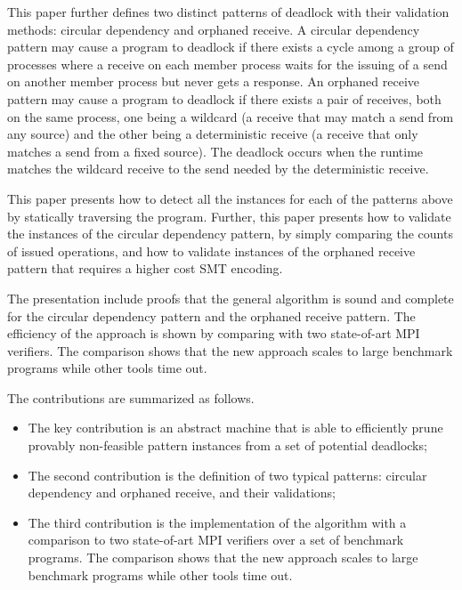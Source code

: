 This paper further defines two distinct patterns of deadlock with their validation methods: circular dependency and orphaned receive. A circular dependency pattern may cause a program to deadlock if there exists a cycle among a group of processes where a receive on each member process waits for the issuing of a send on another member process but never gets a response. An orphaned receive pattern may cause a program to deadlock if there exists a pair of receives, both on the same process, one being a wildcard (a receive that may match a send from any source) and the other being a deterministic receive (a receive that only matches a send from a fixed source). The deadlock occurs when the runtime matches the wildcard receive to the send needed by the deterministic receive. 

This paper presents how to detect all the instances for each of the patterns above by statically traversing the program. Further, this paper presents how to validate the instances of the circular dependency pattern, by simply comparing the counts of issued operations, and how to validate instances of the orphaned receive pattern that requires a higher cost SMT encoding. 

The presentation include proofs that the general algorithm is sound and complete for the circular dependency pattern and the orphaned receive pattern. The efficiency of the approach is shown by comparing with two state-of-art MPI verifiers. The comparison shows that the new approach scales to large benchmark programs while other tools time out.


The contributions are summarized as follows.
\begin{itemize}
\item The key contribution is an abstract machine that is able to efficiently prune provably non-feasible pattern instances from a set of potential deadlocks; 
\item The second contribution is the definition of two typical patterns: circular dependency and orphaned receive, and their validations;
\item The third contribution is the implementation of the algorithm with a comparison to two state-of-art MPI verifiers over a set of benchmark programs. The comparison shows that the new approach scales to large benchmark programs while other tools time out.
\end{itemize}


